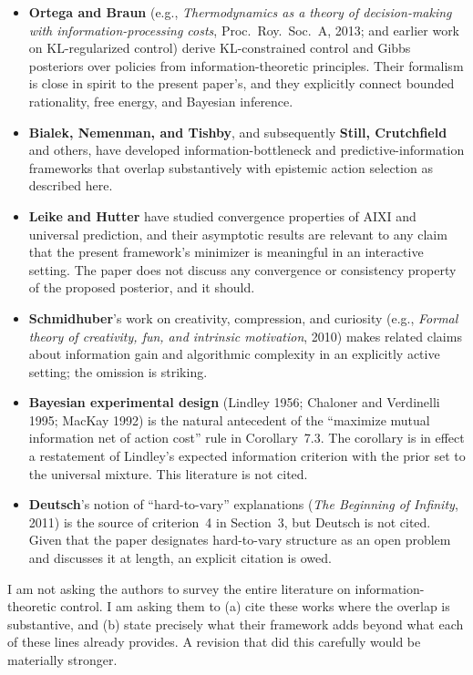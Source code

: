 \documentclass[11pt]{article}
\begin{document}
\begin{itemize}[leftmargin=*]
\item \textbf{Ortega and Braun} (e.g., \emph{Thermodynamics as a theory of decision-making with information-processing costs}, Proc.\ Roy.\ Soc.\ A, 2013; and earlier work on KL-regularized control) derive KL-constrained control and Gibbs posteriors over policies from information-theoretic principles. Their formalism is close in spirit to the present paper's, and they explicitly connect bounded rationality, free energy, and Bayesian inference.
\item \textbf{Bialek, Nemenman, and Tishby}, and subsequently \textbf{Still, Crutchfield} and others, have developed information-bottleneck and predictive-information frameworks that overlap substantively with epistemic action selection as described here.
\item \textbf{Leike and Hutter} have studied convergence properties of AIXI and universal prediction, and their asymptotic results are relevant to any claim that the present framework's minimizer is meaningful in an interactive setting. The paper does not discuss any convergence or consistency property of the proposed posterior, and it should.
\item \textbf{Schmidhuber}'s work on creativity, compression, and curiosity (e.g., \emph{Formal theory of creativity, fun, and intrinsic motivation}, 2010) makes related claims about information gain and algorithmic complexity in an explicitly active setting; the omission is striking.
\item \textbf{Bayesian experimental design} (Lindley 1956; Chaloner and Verdinelli 1995; MacKay 1992) is the natural antecedent of the ``maximize mutual information net of action cost'' rule in Corollary~7.3. The corollary is in effect a restatement of Lindley's expected information criterion with the prior set to the universal mixture. This literature is not cited.
\item \textbf{Deutsch}'s notion of ``hard-to-vary'' explanations (\emph{The Beginning of Infinity}, 2011) is the source of criterion~4 in Section~3, but Deutsch is not cited. Given that the paper designates hard-to-vary structure as an open problem and discusses it at length, an explicit citation is owed.
\end{itemize}

I am not asking the authors to survey the entire literature on information-theoretic control. I am asking them to (a) cite these works where the overlap is substantive, and (b) state precisely what their framework adds beyond what each of these lines already provides. A revision that did this carefully would be materially stronger.
\end{document}
